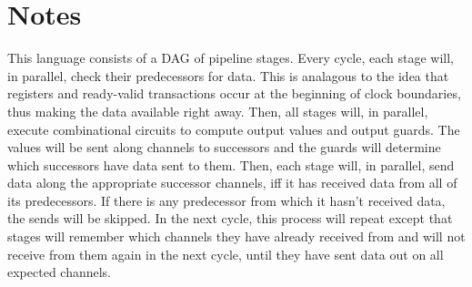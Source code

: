 \documentclass{article}
\begin{document}
\begin{figure}[h]
\begin{syntax}
  








\end{syntax}
\end{figure}
\section{Notes}

This language consists of a DAG of pipeline stages.
Every cycle, each stage will, in parallel, check their
predecessors for data. This is analagous to the idea
that registers and ready-valid transactions occur at the beginning
of clock boundaries, thus making the data available right away.
Then, all stages will, in parallel, execute combinational circuits
to compute output values and output guards. The values will
be sent along channels to successors and the guards will determine
which successors have data sent to them.
Then, each stage will, in parallel, send data along
the appropriate successor channels, iff it has received
data from all of its predecessors. If there is any predecessor
from which it hasn't received data, the sends will be skipped.
In the next cycle, this process will repeat except that stages
will remember which channels they have already received from and
will not receive from them again in the next cycle, until they
have sent data out on all expected channels.
\end{document}
